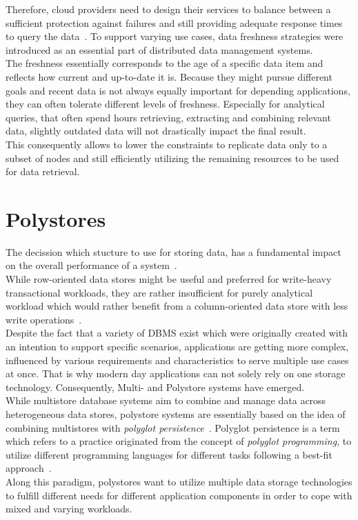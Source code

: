 Therefore, cloud providers need to design their services 
to balance between a sufficient protection against failures and still providing adequate response times to query the data~\cite{cap2002, levandowski2013}.
To support varying use cases, data freshness strategies were introduced as an essential part of distributed data management systems.\\
The freshness essentially corresponds to the age of a specific data item and reflects how current and up-to-date it is.
Because they might pursue different goals and recent data is not always equally important for depending applications, they can often tolerate different levels of freshness.
Especially for analytical queries, that often spend hours retrieving, extracting and combining relevant data, slightly outdated data will not drastically 
impact the final result.\\
This consequently allows to lower the constraints to replicate data only to a subset of nodes and still efficiently 
utilizing the remaining resources to be used for data retrieval.




\section{Polystores}

The decission which stucture to use for storing data, has a fundamental impact on the overall performance of a system~\cite{plattner2015}.\\
While row-oriented data stores might be useful and preferred for write-heavy transactional 
workloads, they are rather insufficient for purely analytical workload which would rather benefit from a
column-oriented data store with less write operations~\cite{sigmond2008}.\\
Despite the fact that a variety of DBMS exist which were originally created with an intention to support specific scenarios,
applications are getting more complex, influenced by various requirements and characteristics to serve multiple use cases at once.
That is why modern day applications can not solely rely on one storage technology. 
Consequently, Multi- and Polystore systems have emerged. \\
While multistore database systems aim to combine and manage data across heterogeneous data stores,
polystore systems are essentially based on the idea of combining multistores with
\textit{polyglot persistence}~\cite{polypheny2020}.
Polyglot persistence is a term which refers to a practice originated from the concept 
of \textit{polyglot programming}, to utilize different 
programming languages for different tasks following a best-fit approach~\cite{fowler2011}. \\
Along this paradigm, polystores want to utilize multiple data storage technologies to
fulfill different needs for different application components in order to cope
with mixed and varying workloads.

